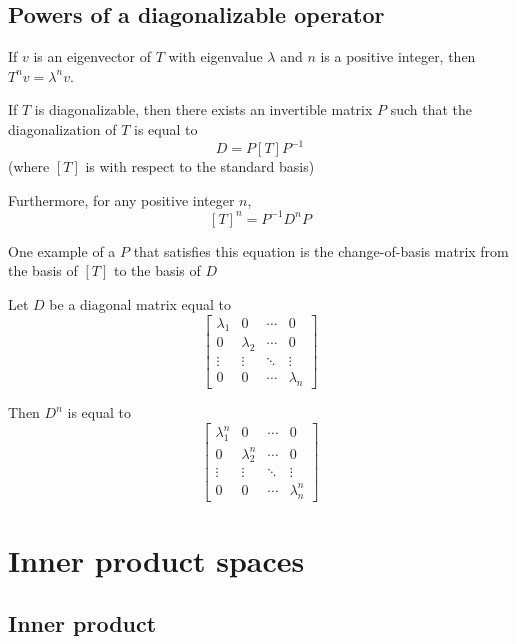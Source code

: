 \subsection{Powers of a diagonalizable operator}

\begin{lemma}
  If $v$ is an eigenvector of $T$ with eigenvalue $\lambda$ and $n$ is a positive integer, then $T^n v = \lambda^n v$.
\end{lemma}

\begin{lemma}
  If $T$ is diagonalizable, then there exists an invertible matrix $P$ such that the diagonalization of $T$ is equal to
  \[
    D = P [T] P^{-1}
  \]
  (where $[T]$ is with respect to the standard basis)

  Furthermore, for any positive integer $n$,
  \[
    [T]^n = P^{-1} D^n P
  \]

  One example of a $P$ that satisfies this equation is the change-of-basis matrix from the basis of $[T]$ to the basis of $D$
\end{lemma}

\begin{procedure}
  Let $D$ be a diagonal matrix equal to
  \[
    \begin{bmatrix}
      \lambda_1 & 0 & \cdots & 0 \\
      0 & \lambda_2 & \cdots & 0 \\
      \vdots & \vdots & \ddots & \vdots \\
      0 & 0 & \cdots & \lambda_n
    \end{bmatrix}
  \]

  Then $D^n$ is equal to
  \[
    \begin{bmatrix}
      \lambda_1^n & 0 & \cdots & 0 \\
      0 & \lambda_2^n & \cdots & 0 \\
      \vdots & \vdots & \ddots & \vdots \\
      0 & 0 & \cdots & \lambda_n^n
    \end{bmatrix}
  \]
\end{procedure}

\section{Inner product spaces}

\subsection{Inner product}


